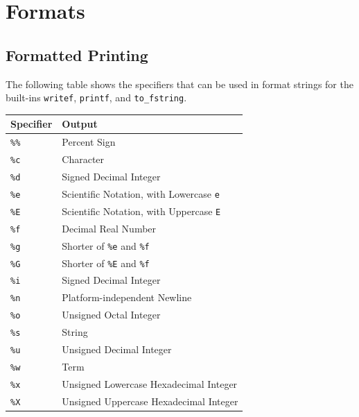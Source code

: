
\chapter{\label{chapter:format}Formats}

\section{Formatted Printing}
The following table shows the specifiers that can be used in format strings for the built-ins \texttt{writef}, \texttt{printf}, and \texttt{to\_fstring}.

\begin{table}[h]
\begin{tabular}{|l|l|}
\hline
\textbf{Specifier} & \textbf{Output} \\
\hline 
\hline 
\texttt{\%\%} & Percent Sign \\
\texttt{\%c} & Character \\
\texttt{\%d} & Signed Decimal Integer \\
\texttt{\%e} & Scientific Notation, with Lowercase \texttt{e} \\
\texttt{\%E} & Scientific Notation, with Uppercase \texttt{E} \\
\texttt{\%f}& Decimal Real Number \\
\texttt{\%g} & Shorter of \texttt{\%e} and \texttt{\%f} \\
\texttt{\%G} & Shorter of \texttt{\%E} and \texttt{\%f} \\
\texttt{\%i} & Signed Decimal Integer \\
\texttt{\%n} & Platform-independent Newline \\
\texttt{\%o} &  Unsigned Octal Integer \\
\texttt{\%s} & String \\
\texttt{\%u} & Unsigned Decimal Integer \\
\texttt{\%w} & Term \\
\texttt{\%x} & Unsigned Lowercase Hexadecimal Integer \\
\texttt{\%X} & Unsigned Uppercase Hexadecimal Integer \\
\hline
\end{tabular}
\end{table}

